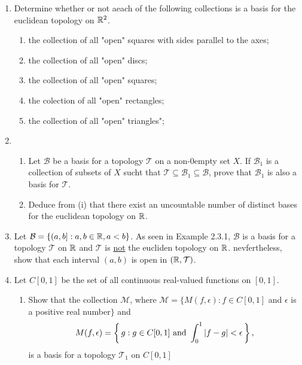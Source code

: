 \documentclass[10pt,a4paper]{report}
\newcommand{\BB}{\mathcal{B}}
\newcommand{\TT}{\mathcal{T}}
\newcommand{\MM}{\mathcal{M}}
\begin{document}
\begin{enumerate}

\item Determine whether or not aeach of the following collections is a basis for the euclidean topology on $\mathbb{R}^2$.

\begin{enumerate}[label=(\roman*)]

	\item the collection of all "open" squares with sides parallel to the axes;
	
	\item the collection of all "open" discs;
	
	\item the collection of all "open" squares;
	
	\item the colection of all "open" rectangles;
	
	\item the collection of all "open" triangles";
	
\end{enumerate}

\item \begin{enumerate}[label=(\roman*)]

	\item Let $\BB$ be a basis for a topology $\TT$ on a non-0empty set $X$.  If $\BB_1$ is a collection of subsets of $X$ sucht that $\TT \subseteq \BB_1 \subseteq \BB$, prove that $\BB_1$ is also a basis for $\TT$.
	
	\item Deduce from (i) that there exist an uncountable number of distinct bases for the euclidean topology on $\mathbb{R}$.

\end{enumerate}

\item Let $\BB = \{(a,b]:a,b\in \R, a < b\}$.  As seen in Example 2.3.1, $\BB$ is a basis for a topology $\TT$ on $\mathbb{R}$ and $\TT$ is \underline{not} the eucliden topology on $\mathbb{R}$.  nevfertheless, show that each interval $(a,b)$ is open in $(\R, \TT)$.

\item Let $C[0,1]$ be the set of all continuous real-valued functions on $[0,1]$.

\begin{enumerate}[label=(\roman*)]

	\item Show that the collection $\MM$, where $\MM = \{M(f,\epsilon):f \in C[0,1]$ and $\epsilon$ is a positive real number$\}$ and \[M(f,\epsilon) = \left \{\, g:g \in C[0,1]\text{ and }\int_0^1|f-g|< \epsilon \,\right \},\] is a basis for a topology $\TT_1$ on $C[0,1]$
	

\end{enumerate}
\end{enumerate}
\end{document}
